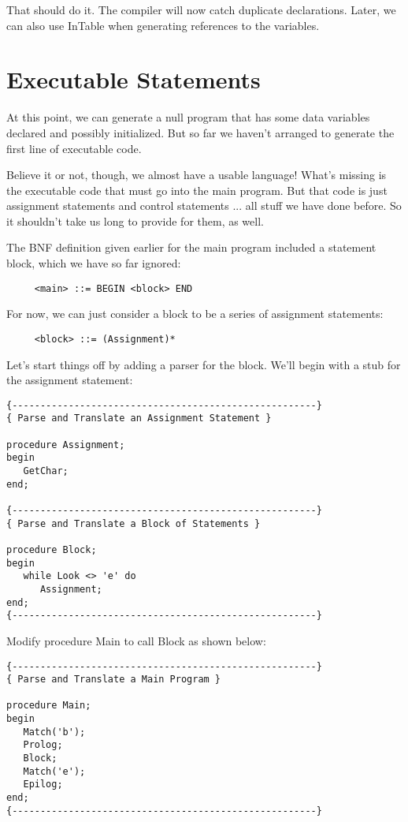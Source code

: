 That  should  do  it. The  compiler  will  now  catch  duplicate declarations. Later, we can  also  use  InTable  when generating references to the variables.

\section{Executable Statements}

At this point, we can generate a null program that has  some data variables  declared  and  possibly initialized. But  so  far  we haven't arranged to generate the first line of executable code.

Believe  it or not, though, we almost  have  a  usable  language!  What's missing is the executable code that must go into  the main program. But that code is just assignment statements and control statements ... all stuff we have done before. So  it  shouldn't take us long to provide for them, as well.

The BNF definition given earlier  for the main program included a statement block, which we have so far ignored:

\begin{verbatim}
     <main> ::= BEGIN <block> END
\end{verbatim}

For now, we  can  just  consider  a  block  to  be  a  series of assignment statements:

\begin{verbatim}
     <block> ::= (Assignment)*
\end{verbatim}

Let's start things off by adding  a  parser for the block. We'll begin with a stub for the assignment statement:

\begin{verbatim}
{------------------------------------------------------}
{ Parse and Translate an Assignment Statement }

procedure Assignment;
begin
   GetChar;
end;

{------------------------------------------------------}
{ Parse and Translate a Block of Statements }

procedure Block;
begin
   while Look <> 'e' do
      Assignment;
end;
{------------------------------------------------------}
\end{verbatim}


Modify procedure Main to call Block as shown below:

\begin{verbatim}
{------------------------------------------------------}
{ Parse and Translate a Main Program }

procedure Main;
begin
   Match('b');
   Prolog;
   Block;
   Match('e');
   Epilog;
end;
{------------------------------------------------------}
\end{verbatim}


